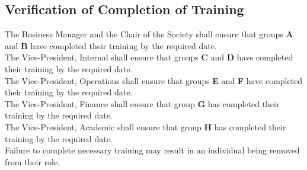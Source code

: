 \subsection{Verification of Completion of Training}

The Business Manager and the Chair of the Society shall ensure that groups \textbf{A} and \textbf{B}
have completed their training by the required date.
\\ The Vice-President, Internal shall ensure that groups \textbf{C} and \textbf{D} have completed their
training by the required date.
\\ The Vice-President, Operations shall ensure that groups \textbf{E} and \textbf{F} have completed their
training by the required date.
\\ The Vice-President, Finance shall ensure that group \textbf{G} has completed their training by the
required date.
\\ The Vice-President, Academic shall ensure that group \textbf{H} has completed their training by the
required date.
\\ Failure to complete necessary training may result in an individual being removed from their role.

